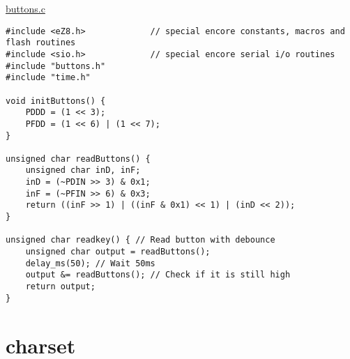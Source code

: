 \underline{buttons.c}
\begin{lstlisting}
#include <eZ8.h>             // special encore constants, macros and flash routines
#include <sio.h>             // special encore serial i/o routines
#include "buttons.h"
#include "time.h"

void initButtons() {
	PDDD = (1 << 3);
	PFDD = (1 << 6) | (1 << 7);
}

unsigned char readButtons() {
	unsigned char inD, inF;
	inD = (~PDIN >> 3) & 0x1;
	inF = (~PFIN >> 6) & 0x3;
	return ((inF >> 1) | ((inF & 0x1) << 1) | (inD << 2));
}

unsigned char readkey() { // Read button with debounce
	unsigned char output = readButtons();
	delay_ms(50); // Wait 50ms
	output &= readButtons(); // Check if it is still high
	return output;
}
\end{lstlisting}

\section{charset}
\label{charset}

